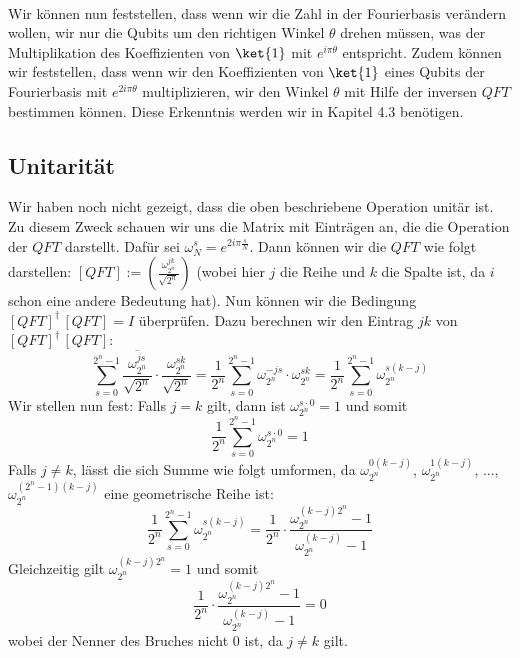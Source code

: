 \paragraph{}

\noindent Wir können nun feststellen, dass wenn wir die Zahl in der Fourierbasis verändern wollen, wir nur die Qubits um den richtigen Winkel $\theta$ drehen müssen, was der Multiplikation des Koeffizienten von $\ket{1}$ mit $e^{i\pi\theta}$ entspricht. Zudem können wir feststellen, dass wenn wir den Koeffizienten von $\ket{1}$ eines Qubits der Fourierbasis mit $e^{2i\pi\theta}$ multiplizieren, wir den Winkel $\theta$ mit Hilfe der inversen $QFT$ bestimmen können. Diese Erkenntnis werden wir in Kapitel 4.3 benötigen.

\subsection{Unitarität}
Wir haben noch nicht gezeigt, dass die oben beschriebene Operation unitär ist. Zu diesem Zweck schauen wir uns die Matrix mit Einträgen an, die die Operation der $QFT$ darstellt. Dafür sei $\omega_N^{s} = e^{2i\pi\frac{s}{N}}$. Dann können wir die $QFT$ wie folgt darstellen: $[QFT] := (\frac{\omega_{2^n}^{jk}}{\sqrt{2^n}})$ (wobei hier $j$ die Reihe und $k$ die Spalte ist, da $i$ schon eine andere Bedeutung hat). Nun können wir die Bedingung $[QFT]^{\dagger}\, [QFT] = I$ überprüfen. Dazu berechnen wir den Eintrag $jk$ von $[QFT]^{\dagger}\, [QFT]$:
$$\sum_{s = 0}^{2^n - 1}\frac{\overline{\omega_{2^n}^{js}}}{\sqrt{2^n}} \cdot \frac{\omega_{2^n}^{sk}}{\sqrt{2^n}} = \frac{1}{2^n}\sum_{s = 0}^{2^n - 1}\omega_{2^n}^{-js} \cdot \omega_{2^n}^{sk} = \frac{1}{2^n}\sum_{s = 0}^{2^n - 1}\omega_{2^n}^{s(k - j)}$$
Wir stellen nun fest: Falls $j = k$ gilt, dann ist $\omega_{2^n}^{s\cdot 0} = 1$ und somit 
$$\frac{1}{2^n}\sum_{s = 0}^{2^n - 1}\omega_{2^n}^{s\cdot 0} = 1$$
Falls $j \neq k$, lässt die sich Summe wie folgt umformen, da $\omega_{2^n}^{0(k - j)}$, $\omega_{2^n}^{1(k - j)}$, ..., $\omega_{2^n}^{(2^n - 1)(k - j)}$ eine geometrische Reihe ist:
$$\frac{1}{2^n}\sum_{s = 0}^{2^n - 1}\omega_{2^n}^{s(k - j)} = \frac{1}{2^n} \cdot \frac{\omega_{2^n}^{(k - j)2^n} - 1}{\omega_{2^n}^{(k - j)} - 1}$$
Gleichzeitig gilt $\omega_{2^n}^{(k - j)2^n} = 1$ und somit 
$$\frac{1}{2^n} \cdot \frac{\omega_{2^n}^{(k - j)2^n} - 1}{\omega_{2^n}^{(k - j)} - 1} = 0$$
wobei der Nenner des Bruches nicht $0$ ist, da $j \neq k$ gilt.

\paragraph{}

